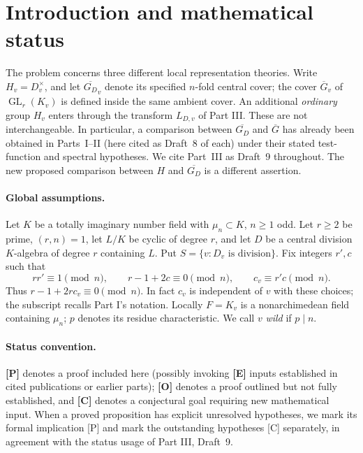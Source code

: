 \documentclass[11pt]{article}
\newcommand{\GL}{\operatorname{GL}}
\newcommand{\Gb}{\overline G}
\newcommand{\GDb}{\overline{G_D}}
\theoremstyle{plain}
\theoremstyle{definition}
\begin{document}
\section{Introduction and mathematical status}\label{sec:intro}
The problem concerns three different local representation theories.
Write $H_v=D_v^\times$, and let $\GDb_v$ denote its specified $n$-fold
central cover; the cover $\Gb_v$ of $\GL_r(K_v)$ is defined inside the
same ambient cover.  An additional \emph{ordinary} group $H_v$ enters
through the transform $L_{D,v}$ of Part III.  These are not interchangeable.
In particular, a comparison between $\GDb$ and $\Gb$ has already been
obtained in Parts~I--II (here cited as Draft~8 of each) under their
stated test-function and spectral hypotheses.  We cite Part~III
as Draft~9 throughout.  The new proposed comparison between $H$ and $\GDb$ is a
different assertion.

\paragraph{Global assumptions.}
Let $K$ be a totally imaginary number field with $\mu_n\subset K$,
$n\geq1$ odd.  Let $r\geq2$ be prime, $(r,n)=1$, let $L/K$ be cyclic
of degree $r$, and let $D$ be a central division $K$-algebra of
degree $r$ containing $L$.  Put $S=\{v:D_v\text{ is division}\}$.
Fix integers $r',c$ such that
\begin{equation}\label{eq:parameters}
 rr'\equiv1\pmod n,\qquad r-1+2c\equiv0\pmod n,
 \qquad c_v\equiv r'c\pmod n.
\end{equation}
Thus $r-1+2rc_v\equiv0\pmod n$.  In fact $c_v$ is independent
of $v$ with these choices; the subscript recalls Part I's notation.
Locally $F=K_v$ is a nonarchimedean field containing $\mu_n$;
$p$ denotes its residue characteristic.  We call $v$ \emph{wild}
if $p\mid n$.

\paragraph{Status convention.}
\textbf{[P]} denotes a proof included here (possibly invoking
\textbf{[E]} inputs established in cited publications or earlier parts);
\textbf{[O]} denotes a proof outlined but not fully established, and
\textbf{[C]} denotes a conjectural goal requiring new mathematical
input.  When a proved proposition has explicit unresolved hypotheses,
we mark its formal implication [P] and mark the outstanding hypotheses
[C] separately, in agreement with the status usage of Part III,
Draft~9.
\end{document}
